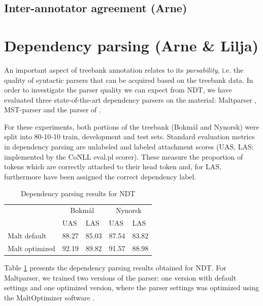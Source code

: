 \documentclass[11pt,a4paper]{article}
\begin{document}
\subsection{Inter-annotator agreement (Arne)}\label{sc:inter-a}

\section{Dependency parsing (Arne \& Lilja)}
An important aspect of treebank annotation relates to its \emph{parsability},
i.e. the quality of syntactic parsers that can be acquired based on
the treebank data.  In order to investigate the parser quality we can
expect from NDT, we have evaluated three state-of-the-art dependency
parsers on the material: Maltparser ,
MST-parser  and the parser of
.  

For these experiments, both portions of the treebank (Bokm{\aa}l and
Nynorsk) were split into 80-10-10 train, development and test sets.
Standard evaluation metrics in dependency parsing are unlabeled and
labeled attachment scores (UAS, LAS; implemented by the CoNLL
\textsf{eval.pl} scorer).  These measure the proportion of tokens
which are correctly attached to their head token and, for LAS,
furthermore have been assigned the correct dependency label.



\begin{table}
\centering
\begin{tabular}{lll|ll}
\hline
& \multicolumn{2}{c}{Bokm{\aa}l} & \multicolumn{2}{c}{Nynorsk}\\
 & UAS & LAS  & UAS & LAS \\\hline
Malt default & 88.27 & 85.03 & 87.54 & 83.82\\
Malt optimized & 92.19 & 89.82 & 91.57 & 88.98\\\hline
\end{tabular}
\caption{Dependency parsing results for NDT}
  \label{tb:parsing}
\end{table}

Table \ref{tb:parsing} presents the dependency parsing results
obtained for NDT.  For Maltparser, we trained two versions of the
parser: one version with default settings and one optimized version,
where the parser settings was optimized using the MaltOptimizer
software .


\clearpage

\end{document}
